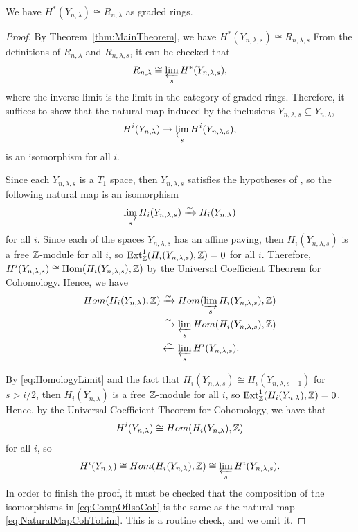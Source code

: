 \documentclass[12pt]{amsart}
\newcommand{\la}{\lambda}
\newcommand{\Hom}{\mathrm{Hom}}
\begin{document}
\begin{theorem}
We have $H^*(Y_{n,\la})\cong R_{n,\la}$ as graded rings.
\end{theorem}

\begin{proof}
By Theorem~\ref{thm:MainTheorem}, we have $H^*(Y_{n,\lambda,s})\cong R_{n,\la,s}$ From the definitions of $R_{n,\la}$ and $R_{n,\la,s}$, it can be checked that
\begin{align}
R_{n,\la} \cong \varprojlim_s H^*(Y_{n,\la,s}),
\end{align}
where the inverse limit is the limit in the category of graded rings. Therefore, it suffices to show that the natural map induced by the inclusions $Y_{n,\la,s}\subseteq Y_{n,\la}$,
\begin{align}\label{eq:NaturalMapCohToLim}
H^i(Y_{n,\la})\to \varprojlim_s H^i(Y_{n,\la,s}),
\end{align}
is an isomorphism for all $i$.

Since each $Y_{n,\la,s}$ is a $T_1$ space, then $Y_{n,\la,s}$ satisfies the hypotheses of \cite[Proposition 3.33]{Hatcher}, so the following natural map is an isomorphism
\begin{align}\label{eq:HomologyLimit}
\varinjlim_s H_i(Y_{n,\la,s}) \xrightarrow{\sim} H_i(Y_{n,\la})
\end{align}
for all $i$. Since each of the spaces $Y_{n,\la,s}$ has an affine paving, then $H_i(Y_{n,\la,s})$ is a free $\mathbb{Z}$-module for all $i$, so $\mathrm{Ext}^1_\bZ(H_i(Y_{n,\la,s}),\bZ)=0$ for all $i$. Therefore, $H^i(Y_{n,\la,s})\cong \Hom(H_i(Y_{n,\la,s}),\bZ)$ by the Universal Coefficient Theorem for Cohomology. Hence, we have
\begin{align}
    Hom(H_i(Y_{n,\la}),\bZ) &\xrightarrow{\sim} Hom(\varinjlim_s H_i(Y_{n,\la,s}),\bZ)\\
    &\xrightarrow{\sim} \varprojlim_s Hom(H_i(Y_{n,\la,s}),\bZ)\\
    &\xleftarrow{\sim} \varprojlim_s H^i(Y_{n,\la,s}).
\end{align}


By \eqref{eq:HomologyLimit} and the fact that $H_i(Y_{n,\la,s}) \cong H_i(Y_{n,\la,s+1})$ for $s>i/2$, then $H_{i}(Y_{n,\la})$ is a free $\mathbb{Z}$-module for all $i$, so $\mathrm{Ext}^1_\bZ(H_i(Y_{n,\la}),\bZ)=0$. Hence, by the Universal Coefficient Theorem for Cohomology, we have that
\begin{align}
H^i(Y_{n,\la}) \cong Hom(H_i(Y_{n,\la}),\bZ)
\end{align}
for all $i$, so 
\begin{align}\label{eq:CompOfIsoCoh}
H^i(Y_{n,\la}) \cong Hom(H_i(Y_{n,\la}),\bZ) \cong \varprojlim_s H^i(Y_{n,\la,s}).
\end{align}
In order to finish the proof, it must be checked that the composition of the isomorphisms in \eqref{eq:CompOfIsoCoh} is the same as the natural map \eqref{eq:NaturalMapCohToLim}. This is a routine check, and we omit it.
\end{proof}
\end{document}
